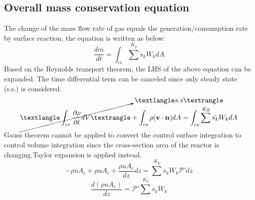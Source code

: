 \documentclass[11pt]{article}
\begin{document}
\subsection{Overall mass conservation equation}
The change of the mass flow rate of gas equals the generation/consumption rate by surface reaction, the equation is written as below\cite{kee2005chemically}:
\begin{equation}
    \frac{dm}{dt} = \int_{cs} \sum^{K_g} \dot s_k W_k dA
\end{equation}
Based on the Reynolds transport theorem, the LHS of the above equation can be expanded. The time differential term can be canceled since only steady state (s.s.) is considered.
\begin{equation}
    \cancelto{〈s.s〉}{〈\int_{cv}\frac{\partial \rho}{\partial t}dV〉} + \int_{cs} \rho (\textbf{v} \cdot \textbf{n})dA = \int_{cs}\sum^{Kg}\dot{s_k}W_kdA
\end{equation}
Gauss theorem cannot be applied to convert the control surface integration to control volume integration since the cross-section area of the reactor is changing.Taylor expansion is applied instead.
\begin{equation}
    -\rho u A_c + \rho u A_c + \frac{\rho u A_c}{dz}dz = \sum^{K_g}\dot{s_k}W_k\mathscr{P}'dz
\end{equation}
\begin{equation}
    \boxed{\frac{d(\rho u A_c)}{dz} = \mathscr{P}'\sum^{K_g}\dot{s_k}W_k}
\end{equation}
\end{document}
